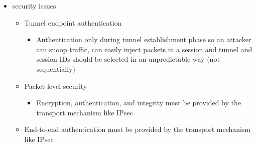 \documentclass{article}
\begin{document}
\begin{itemize}
\begin{itemize}
        \item security issues
        \begin{itemize}
            \item Tunnel endpoint authentication
            \begin{itemize}
                \item Authentication only during tunnel establishment phase so an attacker can snoop traffic, can easily inject packets in a session and tunnel and session IDs should be selected in an unpredictable way (not sequentially)
            \end{itemize}
            \item Packet level security
            \begin{itemize}
                \item Encryption, authentication, and integrity must be provided by the transport mechanism like IPsec
            \end{itemize}
            \item End-to-end authentication must be provided by the transport mechanism like IPsec
        \end{itemize}
    \end{itemize}
\end{itemize}
\end{document}
